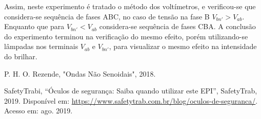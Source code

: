 \documentclass[a4paper,12pt,oneside,openany,table,xcdraw]{article}
\begin{document}
Assim, neste experimento é tratado o método dos voltímetros, e verificou-se que considera-se sequência de fases ABC, no caso de tensão na fase B $V_{bn'}>V_{ab}$. Enquanto que para $V_{bn'}<V_{ab}$ considera-se sequência de fases CBA. A conclusão do experimento terminou na verificação do mesmo efeito, porém utilizando-se lâmpadas nos terminais $V_{ab}$ e $V_{bn'}$, para visualizar o mesmo efeito na intensidade do brilhar.

\newpage
\begin{thebibliography}{9} 
    P. H. O. Rezende,
    "Ondas Não Senoidais", 2018.

    SafetyTrabi,
    “Óculos de segurança: Saiba quando utilizar este EPI”, SafetyTrab, 2019.
 Disponível em:
 \url{https://www.safetytrab.com.br/blog/oculos-de-seguranca/}. Acesso em: ago. 2019.

\end{thebibliography}
\end{document}
